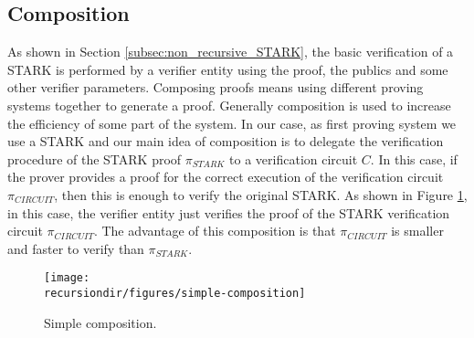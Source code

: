 \subsection{Composition}

As shown in Section \ref{subsec:non_recursive_STARK}, the basic verification of a STARK is performed by a verifier entity using the proof, the publics and some other verifier parameters.
Composing proofs means using different proving systems together to generate a proof.
Generally composition is used to increase the efficiency of some part of the system.
In our case, as first proving system we use a STARK and our main idea of composition is to delegate the verification procedure of the STARK proof $\pi_{STARK}$ to a verification circuit $C$.
In this case, if the prover provides a proof for the correct execution of the verification circuit $\pi_{CIRCUIT}$, then this is enough to verify the original STARK.
As shown in Figure \ref{fig:simple-composition}, in this case, 
the verifier entity just verifies the proof of the STARK verification circuit $\pi_{CIRCUIT}$.
The advantage of this composition is that $\pi_{CIRCUIT}$ is smaller and faster to verify than $\pi_{STARK}$.

\begin{figure}[H]
\centering
\texttt{[image: \\recursiondir/figures/simple-composition]}
\caption{Simple composition.}
\label{fig:simple-composition}
\end{figure}
